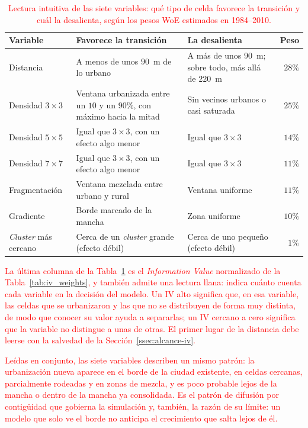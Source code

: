 \begin{table}[htbp]
\centering
\color{red}
\small
\caption{\textcolor{red}{Lectura intuitiva de las siete variables: qué tipo de celda favorece la transición y cuál la desalienta, según los pesos WoE estimados en 1984--2010.}}
\label{tab:lectura-intuitiva}
\begin{tabularx}{\textwidth}{@{}l X X r@{}}
\toprule
\textbf{Variable} & \textbf{Favorece la transición} & \textbf{La desalienta} & \textbf{Peso} \\
\midrule
Distancia & A menos de unos $90$~m de lo urbano & A más de unos $90$~m; sobre todo, más allá de $220$~m & $28\%$ \\
Densidad $3\times3$ & Ventana urbanizada entre un $10$ y un $90\%$, con máximo hacia la mitad & Sin vecinos urbanos o casi saturada & $25\%$ \\
Densidad $5\times5$ & Igual que $3\times3$, con un efecto algo menor & Igual que $3\times3$ & $14\%$ \\
Densidad $7\times7$ & Igual que $3\times3$, con un efecto algo menor & Igual que $3\times3$ & $11\%$ \\
Fragmentación & Ventana mezclada entre urbano y rural & Ventana uniforme & $11\%$ \\
Gradiente & Borde marcado de la mancha & Zona uniforme & $10\%$ \\
\textit{Cluster} más cercano & Cerca de un \textit{cluster} grande (efecto débil) & Cerca de uno pequeño (efecto débil) & $1\%$ \\
\bottomrule
\end{tabularx}
\end{table}

\textcolor{red}{La última columna de la Tabla~\ref{tab:lectura-intuitiva} es el
\textit{Information Value} normalizado de la Tabla~\ref{tab:iv_weights}, y
también admite una lectura llana: indica cuánto cuenta cada variable en la
decisión del modelo. Un IV alto significa que, en esa variable, las celdas que
se urbanizaron y las que no se distribuyen de forma muy distinta, de modo que
conocer su valor ayuda a separarlas; un IV cercano a cero significa que la
variable no distingue a unas de otras. El primer lugar de la distancia debe
leerse con la salvedad de la Sección~\ref{ssec:alcance-iv}.}

\textcolor{red}{Leídas en conjunto, las siete variables describen un mismo
patrón: la urbanización nueva aparece en el borde de la ciudad existente, en
celdas cercanas, parcialmente rodeadas y en zonas de mezcla, y es poco
probable lejos de la mancha o dentro de la mancha ya consolidada. Es el
patrón de difusión por contigüidad que gobierna la simulación y, también, la
razón de su límite: un modelo que solo ve el borde no anticipa el crecimiento
que salta lejos de él.}

